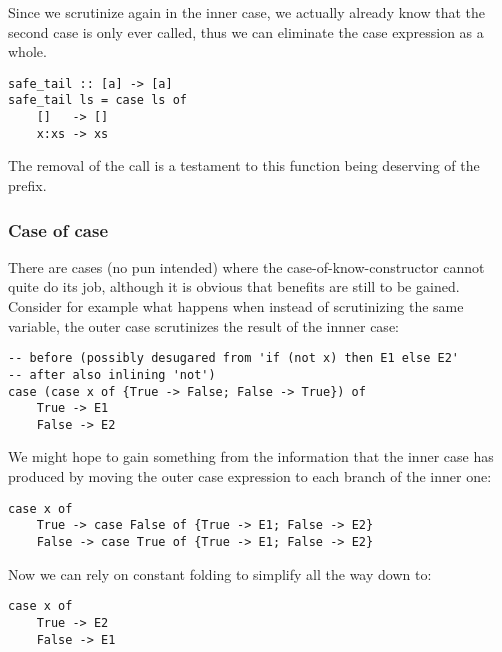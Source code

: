 Since we scrutinize  again in the inner case, we actually already know that the second case is only ever called,
thus we can eliminate the case expression as a whole.

\begin{listing}[H]
\begin{verbatim}
safe_tail :: [a] -> [a]
safe_tail ls = case ls of
    []   -> []
    x:xs -> xs
\end{verbatim}
\end{listing}

The removal of the call  is a testament to this function being deserving of the  prefix.

\subsubsection{Case of case}

There are cases (no pun intended) where the case-of-know-constructor cannot quite do its job, although it is obvious
that benefits are still to be gained. Consider for example what happens when instead of scrutinizing the same variable,
the outer case scrutinizes the result of the innner case:


\begin{listing}[H]
\begin{verbatim}
-- before (possibly desugared from 'if (not x) then E1 else E2'
-- after also inlining 'not')
case (case x of {True -> False; False -> True}) of
    True -> E1
    False -> E2
\end{verbatim}
\end{listing}

We might hope to gain something from the information that the inner case has produced by moving the outer case expression
to each branch of the inner one:

\begin{listing}[H]
\begin{verbatim}
case x of
    True -> case False of {True -> E1; False -> E2}
    False -> case True of {True -> E1; False -> E2}
\end{verbatim}
\end{listing}

Now we can rely on constant folding to simplify all the way down to:

\begin{listing}[H]
\begin{verbatim}
case x of
    True -> E2
    False -> E1
\end{verbatim}
\end{listing}

